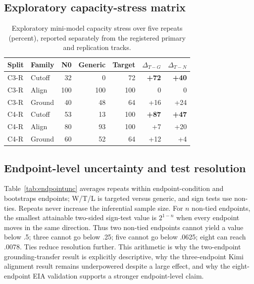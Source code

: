 \subsection{Exploratory capacity-stress matrix}
\begin{table}[ht]
\centering
\small
\setlength{\tabcolsep}{4pt}
\begin{tabular}{llrrrrr}
\toprule
Split & Family & N0 & Generic & Target & $\Delta_{T-G}$ & $\Delta_{T-N}$ \\
\midrule
C3-R & Cutoff & 32 & 0 & 72 & \textbf{+72} & \textbf{+40} \\
C3-R & Align & 100 & 100 & 100 & 0 & 0 \\
C3-R & Ground & 40 & 48 & 64 & +16 & +24 \\
C4-R & Cutoff & 53 & 13 & 100 & \textbf{+87} & \textbf{+47} \\
C4-R & Align & 80 & 93 & 100 & +7 & +20 \\
C4-R & Ground & 60 & 52 & 64 & +12 & +4 \\
\bottomrule
\end{tabular}
\caption{Exploratory mini-model capacity stress over five repeats (percent), reported separately from the registered primary and replication tracks.}
\label{tab:capacity}
\end{table}

\subsection{Endpoint-level uncertainty and test resolution}
Table~\ref{tab:endpointunc} averages repeats within endpoint-condition and bootstraps endpoints; W/T/L is targeted versus generic, and sign tests use non-ties. Repeats never increase the inferential sample size. For $n$ non-tied endpoints, the smallest attainable two-sided sign-test value is $2^{1-n}$ when every endpoint moves in the same direction. Thus two non-tied endpoints cannot yield a value below .5; three cannot go below .25; five cannot go below .0625; eight can reach .0078. Ties reduce resolution further. This arithmetic is why the two-endpoint grounding-transfer result is explicitly descriptive, why the three-endpoint Kimi alignment result remains underpowered despite a large effect, and why the eight-endpoint EIA validation supports a stronger endpoint-level claim.

